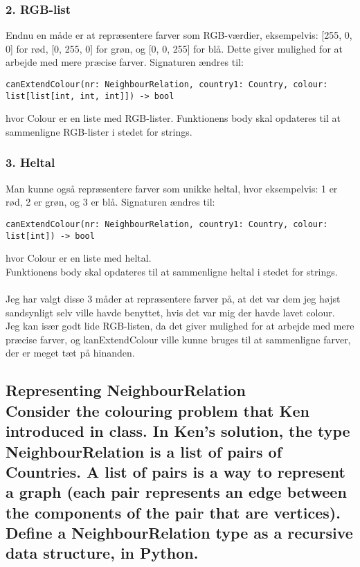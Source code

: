 \documentclass[a4paper,12pt]{article}
\begin{document}
\subsubsection*{2. RGB-list}
Endnu en måde er at repræsentere farver som RGB-værdier, eksempelvis: [255, 0, 0] for rød, [0, 255, 0] for grøn, og [0, 0, 255] for blå. Dette giver mulighed for at arbejde med mere præcise farver.
Signaturen ændres til:
\begin{lstlisting}
canExtendColour(nr: NeighbourRelation, country1: Country, colour: list[list[int, int, int]]) -> bool
\end{lstlisting}
hvor Colour er en liste med RGB-lister.
Funktionens body skal opdateres til at sammenligne RGB-lister i stedet for strings.

\subsubsection*{3. Heltal}
Man kunne også repræsentere farver som unikke heltal, hvor eksempelvis: 1 er rød, 2 er grøn, og 3 er blå.
Signaturen ændres til:
\begin{lstlisting}
canExtendColour(nr: NeighbourRelation, country1: Country, colour: list[int]) -> bool
\end{lstlisting}
hvor Colour er en liste med heltal.\\
Funktionens body skal opdateres til at sammenligne heltal i stedet for strings.\\
\\
Jeg har valgt disse 3 måder at repræsentere farver på, at det var dem jeg højst sandsynligt selv ville havde benyttet, hvis det var mig der havde lavet colour.\\
Jeg kan især godt lide RGB-listen, da det giver mulighed for at arbejde med mere præcise farver, og kanExtendColour ville kunne bruges til at sammenligne farver, der er meget tæt på hinanden.

\subsection[Representing NeighbourRelation]{Representing NeighbourRelation\\
Consider the colouring problem that Ken introduced in class.
In Ken's solution, the type NeighbourRelation is a list of pairs of Countries.
A list of pairs is a way to represent a graph (each pair represents an edge between the components of the pair that are vertices).
Define a NeighbourRelation type as a recursive data structure, in Python.}
\end{document}
